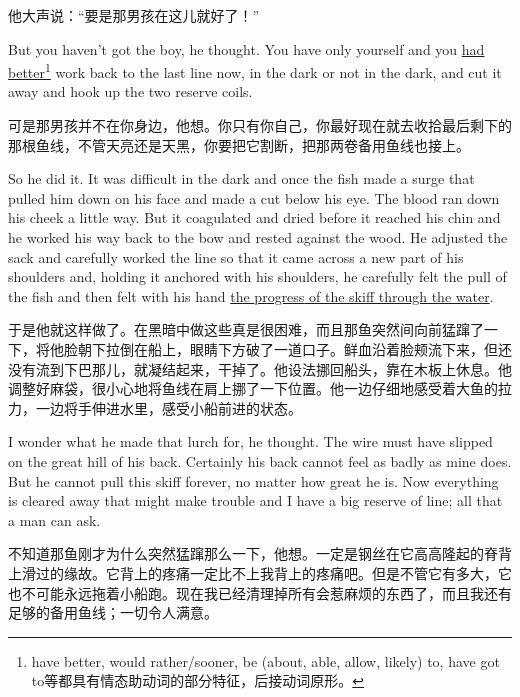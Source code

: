 \begin{paracol}{2}
\switchcolumn

他大声说：“要是那男孩在这儿就好了！”

\switchcolumn*

But you haven't got the boy, he thought. You have only yourself and you
\uline{had better}\footnote{have better, would rather/sooner, be (about, able,
  allow, likely) to, have got to等都具有情态助动词的部分特征，后接动词原形。}
work back to the last line now, in the dark or not in the dark, and cut it
away and hook up the two reserve coils.

\switchcolumn

可是那男孩并不在你身边，他想。你只有你自己，你最好现在就去收拾最后剩下的那根鱼线，不管天亮还是天黑，你要把它割断，把那两卷备用鱼线也接上。

\switchcolumn*

So he did it. It was difficult in the dark and once the fish made a
\gls{surge} that pulled him down on his face and made a cut below his eye.
The blood ran down his cheek a little way. But it \gls{coagulated} and dried
before it reached his \gls{chin} and he worked his way back to the bow and
rested against the wood. He \gls{adjusted} the sack and carefully worked the
line so that it came across a new part of his shoulders and, holding it
\gls{anchored} with his shoulders, he carefully felt the pull of the fish and
then felt with his hand \uline{the \gls{progress} of the skiff through the water}.

\switchcolumn

于是他就这样做了。在黑暗中做这些真是很困难，而且那鱼突然间向前猛蹿了一下，将他脸朝下拉倒在船上，眼睛下方破了一道口子。鲜血沿着脸颊流下来，但还没有流到下巴那儿，就凝结起来，干掉了。他设法挪回船头，靠在木板上休息。他调整好麻袋，很小心地将鱼线在肩上挪了一下位置。他一边仔细地感受着大鱼的拉力，一边将手伸进水里，感受小船前进的状态。

\switchcolumn*

I wonder what he made that \gls{lurch} for, he thought. The wire must have
slipped on the great hill of his back. Certainly his back cannot feel as
badly as mine does. But he cannot pull this skiff forever, no matter how
great he is. Now everything is cleared away that might make trouble and I
have a big reserve of line; all that a man can ask.

\switchcolumn

不知道那鱼刚才为什么突然猛蹿那么一下，他想。一定是钢丝在它高高隆起的脊背上滑过的缘故。它背上的疼痛一定比不上我背上的疼痛吧。但是不管它有多大，它也不可能永远拖着小船跑。现在我已经清理掉所有会惹麻烦的东西了，而且我还有足够的备用鱼线；一切令人满意。


\end{paracol}
